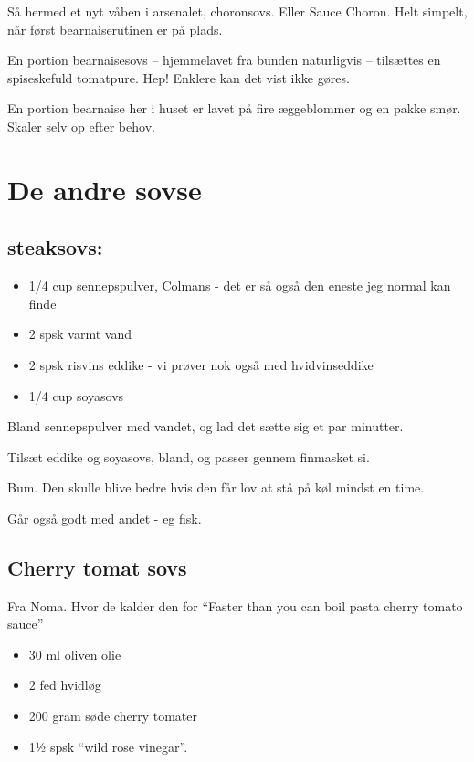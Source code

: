\documentclass[
  letterpaper,
  DIV=11,
  numbers=noendperiod]{scrreprt}
\providecommand{\tightlist}{%
  \setlength{\itemsep}{0pt}\setlength{\parskip}{0pt}}\usepackage{longtable,booktabs,array}
\begin{document}
Så hermed et nyt våben i arsenalet, choronsovs. Eller Sauce Choron. Helt
simpelt, når først bearnaiserutinen er på plads.

En portion bearnaisesovs -- hjemmelavet fra bunden naturligvis --
tilsættes en spiseskefuld tomatpure. Hep! Enklere kan det vist ikke
gøres.~

En portion bearnaise her i huset er lavet på fire æggeblommer og en
pakke smør. Skaler selv op efter behov.

\hypertarget{de-andre-sovse}{%
\section{De andre sovse}\label{de-andre-sovse}}

\hypertarget{steaksovs}{%
\subsection{steaksovs:}\label{steaksovs}}

\begin{itemize}
\tightlist
\item
  1/4 cup sennepspulver, Colmans - det er så også den eneste jeg normal
  kan finde
\item
  2 spsk varmt vand
\item
  2 spsk risvins eddike - vi prøver nok også med hvidvinseddike
\item
  1/4 cup soyasovs
\end{itemize}

Bland sennepspulver med vandet, og lad det sætte sig et par minutter.

Tilsæt eddike og soyasovs, bland, og passer gennem finmasket si.

Bum. Den skulle blive bedre hvis den får lov at stå på køl mindst en
time.

Går også godt med andet - eg fisk.

\hypertarget{cherry-tomat-sovs}{%
\subsection{Cherry tomat sovs}\label{cherry-tomat-sovs}}

Fra Noma. Hvor de kalder den for ``Faster than you can boil pasta cherry
tomato sauce''

\begin{itemize}
\tightlist
\item
  30 ml oliven olie
\item
  2 fed hvidløg
\item
  200 gram søde cherry tomater
\item
  1½ spsk ``wild rose vinegar''.
\end{itemize}
\end{document}
